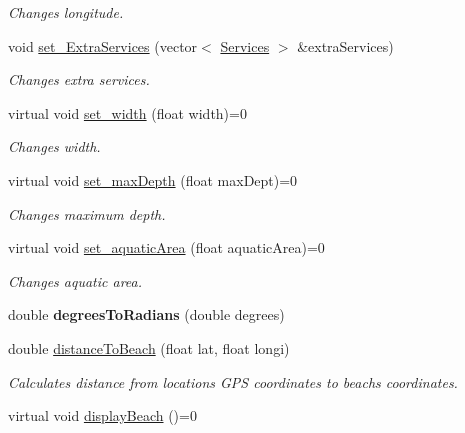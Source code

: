 \begin{DoxyCompactItemize}
\begin{DoxyCompactList}\small\item\em Changes longitude. \end{DoxyCompactList}\item 
void \hyperlink{class_beach_ae3e07bb07ec9c8b633ecb600c80567f2}{set\+\_\+\+Extra\+Services} (vector$<$ \hyperlink{class_services}{Services} $>$ \&extra\+Services)
\begin{DoxyCompactList}\small\item\em Changes extra services. \end{DoxyCompactList}\item 
virtual void \hyperlink{class_beach_a3f3a4bde9008bcc87861710e8c99c008}{set\+\_\+width} (float width)=0
\begin{DoxyCompactList}\small\item\em Changes width. \end{DoxyCompactList}\item 
virtual void \hyperlink{class_beach_af0226438bc6e731b2bca9f5a6078b572}{set\+\_\+max\+Depth} (float max\+Dept)=0
\begin{DoxyCompactList}\small\item\em Changes maximum depth. \end{DoxyCompactList}\item 
virtual void \hyperlink{class_beach_a37e71c3348356d49f3b1080973708376}{set\+\_\+aquatic\+Area} (float aquatic\+Area)=0
\begin{DoxyCompactList}\small\item\em Changes aquatic area. \end{DoxyCompactList}\item 
\mbox{\label{class_beach_ae26aa5e34a3c7a85b297204f2d71fef3}} 
double {\bfseries degrees\+To\+Radians} (double degrees)
\item 
double \hyperlink{class_beach_a4b7774165afd3ae88952281b9d846865}{distance\+To\+Beach} (float lat, float longi)
\begin{DoxyCompactList}\small\item\em Calculates distance from location\textquotesingle{}s G\+PS coordinates to beach\textquotesingle{}s coordinates. \end{DoxyCompactList}\item 
\mbox{\label{class_beach_a05675f3e8c2523cc7db11aeb66933867}} 
virtual void \hyperlink{class_beach_a05675f3e8c2523cc7db11aeb66933867}{display\+Beach} ()=0

\end{DoxyCompactItemize}
